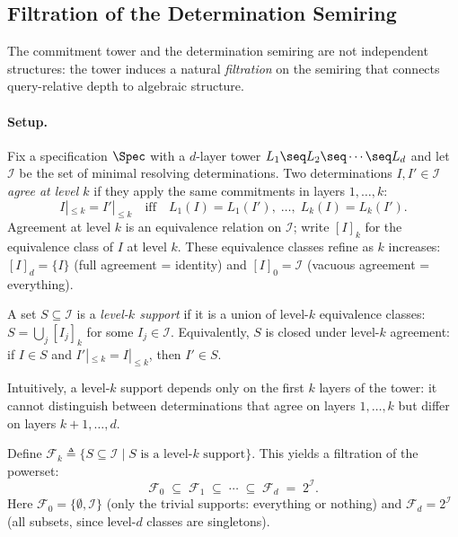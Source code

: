 
\subsection{Filtration of the Determination Semiring}
\label{sec:filtration}

The commitment tower and the determination semiring are not independent
structures: the tower induces a natural \emph{filtration} on the semiring
that connects query-relative depth to algebraic structure.

\paragraph{Setup.}
Fix a specification $\Spec$ with a $d$-layer tower
$L_1 \seq L_2 \seq \cdots \seq L_d$ and let $\mathcal{I}$ be the set of
minimal resolving determinations.
Two determinations $I, I' \in \mathcal{I}$ \emph{agree at level $k$} if
they apply the same commitments in layers $1, \ldots, k$:
\[
  I|_{\le k} = I'|_{\le k}
  \quad\text{iff}\quad
  L_1(I) = L_1(I'),\; \ldots,\; L_k(I) = L_k(I').
\]
Agreement at level $k$ is an equivalence relation on $\mathcal{I}$;
write $[I]_k$ for the equivalence class of $I$ at level $k$.
These equivalence classes refine as $k$ increases:
$[I]_d = \{I\}$ (full agreement = identity) and
$[I]_0 = \mathcal{I}$ (vacuous agreement = everything).

\begin{definition}
  A set $S \subseteq \mathcal{I}$ is a \emph{level-$k$ support} if it is a
  union of level-$k$ equivalence classes:
  $S = \bigcup_{j} [I_j]_k$ for some $I_j \in \mathcal{I}$.
  Equivalently, $S$ is closed under level-$k$ agreement:
  if $I \in S$ and $I'|_{\le k} = I|_{\le k}$, then $I' \in S$.
\end{definition}

\noindent
Intuitively, a level-$k$ support depends only on the first $k$ layers of
the tower: it cannot distinguish between determinations that agree on
layers $1, \ldots, k$ but differ on layers $k+1, \ldots, d$.

\begin{definition}[Filtration]
  Define $\mathcal{F}_k \triangleq \{S \subseteq \mathcal{I} \mid
  S \text{ is a level-}k\text{ support}\}$.
  This yields a filtration of the powerset:
  \[
    \mathcal{F}_0 \;\subseteq\; \mathcal{F}_1 \;\subseteq\; \cdots
    \;\subseteq\; \mathcal{F}_d \;=\; 2^{\mathcal{I}}.
  \]
  Here $\mathcal{F}_0 = \{\emptyset, \mathcal{I}\}$ (only the trivial
  supports: everything or nothing) and $\mathcal{F}_d = 2^{\mathcal{I}}$
  (all subsets, since level-$d$ classes are singletons).
\end{definition}

